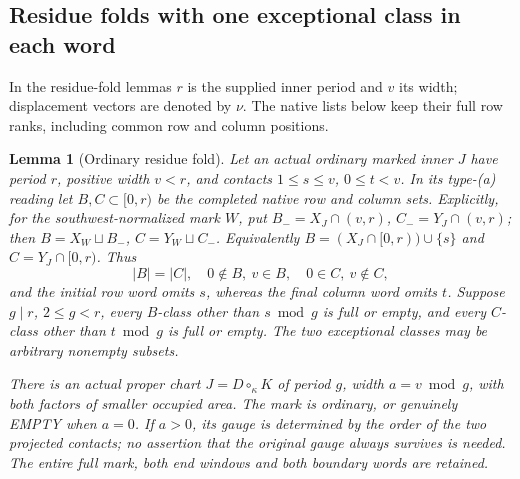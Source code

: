 \documentclass[11pt,a4paper]{amsart}
\numberwithin{equation}{section}
\theoremstyle{plain}
\newtheorem{lemma}[theorem]{Lemma}
\theoremstyle{definition}
\begin{document}
\subsection{Residue folds with one exceptional class in each word}

In the residue-fold lemmas \(r\) is the supplied inner period and
\(v\) its width; displacement vectors are denoted by \(\nu\).
The native lists below keep their full row ranks, including common
row and column positions.

\begin{lemma}[Ordinary residue fold]\label{ge:ordinary-fold}
Let an actual ordinary marked inner \(J\) have period \(r\), positive
width \(v<r\), and contacts \(1\le s\le v\), \(0\le t<v\).
In its type-(a) reading let \(B,C\subset[0,r)\) be the completed
native row and column sets.  Explicitly, for the southwest-normalized
mark \(W\), put \(B_-=X_J\cap(v,r)\), \(C_-=Y_J\cap(v,r)\);
then \(B=X_W\sqcup B_-\), \(C=Y_W\sqcup C_-\).
Equivalently \(B=(X_J\cap[0,r))\cup\{s\}\) and
\(C=Y_J\cap[0,r)\).  Thus
\[
 |B|=|C|,\quad 0\notin B,\ v\in B,\quad
 0\in C,\ v\notin C,
\]
and the initial row word omits \(s\), whereas the final column word
omits \(t\).  Suppose \(g\mid r\), \(2\le g<r\), every
\(B\)-class other than \(s\bmod g\) is full or empty, and every
\(C\)-class other than \(t\bmod g\) is full or empty.  The two
exceptional classes may be arbitrary nonempty subsets.

There is an actual proper chart \(J=D\circ_\kappa K\) of period
\(g\), width \(a=v\bmod g\), with both factors of smaller
occupied area.  The mark is ordinary, or genuinely EMPTY when \(a=0\).
If \(a>0\), its gauge is determined by the order of the two projected
contacts; no assertion that the original gauge always survives is needed.
The entire full mark, both end windows and both boundary words are retained.
\end{lemma}
\end{document}

